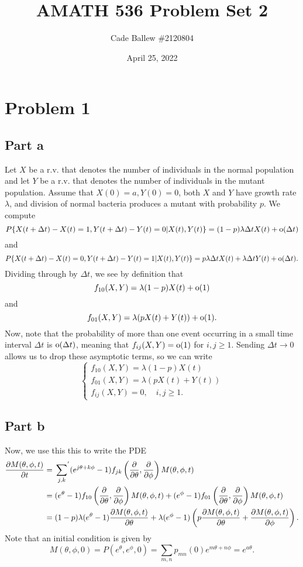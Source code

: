 \documentclass{article}
\title{AMATH 536 Problem Set 2}
\author{Cade Ballew \#2120804}
\date{April 25, 2022}
\begin{document}
	
\maketitle
	
\section{Problem 1}
\subsection{Part a}
Let $X$ be a r.v. that denotes the number of individuals in the normal population and let $Y$ be a r.v. that denotes the number of individuals in the mutant population. Assume that $X(0)=a, Y(0)=0$, both $X$ and $Y$ have growth rate $\lambda$, and division of normal bacteria produces a mutant with probability $p$. We compute
$$P\{X(t+\Delta t)-X(t)=1, Y(t+\Delta t)-Y(t)=0 | X(t),Y(t)\}=(1-p)\lambda\Delta tX(t)+\operatorname{o}(\Delta t)  $$ 
and
$$P\{X(t+\Delta t)-X(t)=0, Y(t+\Delta t)-Y(t)=1 | X(t),Y(t)\}=p\lambda\Delta tX(t)+\lambda\Delta tY(t)+\operatorname{o}(\Delta t).  $$ 
Dividing through by $\Delta t$, we see by definition that
\[
f_{10}(X,Y)=\lambda(1-p)X(t)+\operatorname{o}(1)
\]
and
\[
f_{01}(X,Y)=\lambda (pX(t)+Y(t))+\operatorname{o}(1).
\]
Now, note that the probability of more than one event occurring in a small time interval $\Delta t$ is $\operatorname{o}(\Delta t)$, meaning that $f_{ij}(X,Y)=\operatorname{o}(1)$ for $i,j\geq1$. Sending $\Delta t\to0$ allows us to drop these asymptotic terms, so we can write
\[
\begin{cases}
	f_{10}(X,Y)=\lambda(1-p)X(t)\\
	f_{01}(X,Y)=\lambda (pX(t)+Y(t))\\
	f_{ij}(X,Y)=0, \quad i,j\geq1.
\end{cases}
\]

\subsection{Part b}
Now, we use this this to write the PDE
\begin{align*}
\frac{\partial M(\theta,\phi,t)}{\partial t}&=\sideset{}{^{'}}\sum_{j,k}(e^{j\theta+k\phi}-1)f_{jk}\left(\frac{\partial}{\partial \theta},\frac{\partial}{\partial \phi}\right) M(\theta,\phi,t)\\&=
(e^{\theta}-1)f_{10}\left(\frac{\partial}{\partial \theta},\frac{\partial}{\partial \phi}\right) M(\theta,\phi,t)+(e^{\phi}-1)f_{01}\left(\frac{\partial}{\partial \theta},\frac{\partial}{\partial \phi}\right) M(\theta,\phi,t)\\&=
(1-p)\lambda(e^\theta-1)\frac{\partial M(\theta,\phi,t)}{\partial \theta}+\lambda(e^\phi-1)\left(p\frac{\partial M(\theta,\phi,t)}{\partial \theta}+\frac{\partial M(\theta,\phi,t)}{\partial \phi}\right). 
\end{align*}
Note that an initial condition is given by
\[
M(\theta, \phi,0)=P(e^\theta,e^\phi,0)=\sum_{m,n}p_{mn}(0)e^{m\theta+n\phi}=e^{a\theta}.
\]
\end{document}
